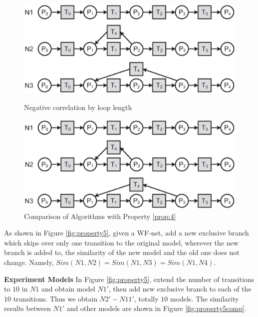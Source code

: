 \documentclass{llncs}
\begin{document}
\begin{figure}[ht]
\centering
\begin{minipage}[t]{0.45\textwidth}
	\centering
	\includegraphics[width=1\textwidth]{fig_property_4.eps}
	\caption{Negative correlation by loop length}
	\label{fig:property4}
\end{minipage}
\hspace{0.1in}
\begin{minipage}[t]{0.45\textwidth}
	\centering
	\includegraphics[width=1\textwidth]{fig_property_4.eps}
	\caption{Comparison of Algorithms with Property \ref{prop:4}}
	\label{fig:property4comp}
\end{minipage}
\end{figure}

\begin{property}\label{prop:5}
As shown in Figure \ref{fig:property5}, given a WF-net, add a new exclusive branch which skips over only one transition to the original model, wherever the new branch is added to, the similarity of the new model and the old one does not change. Namely, $Sim(N1,N2)=Sim(N1,N3)=Sim(N1,N4)$.
\end{property}
\textbf{Experiment Models} In Figure \ref{fig:property5}, extend the number of transitions to $10$ in $N1$ and obtain model $N1'$, then add new exclusive branch to each of the $10$ transitions. Thus we obtain $N2'-N11'$, totally $10$ models. The similarity results between $N1'$ and other models are shown in Figure \ref{fig:property5comp}.
\end{document}
